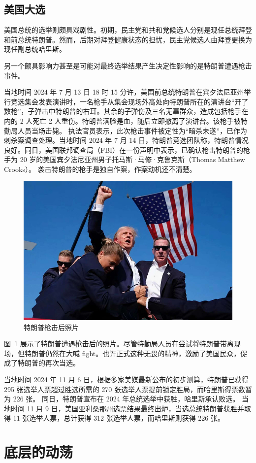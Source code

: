 \subsection{美国大选}

美国总统的选举则颇具戏剧性。初期，民主党和共和党候选人分别是现任总统拜登和前总统特朗普。然而，后期对拜登健康状态的担忧，民主党候选人由拜登更换为现任副总统哈里斯。

另一个颇具影响力甚至是可能对最终选举结果产生决定性影响的是特朗普遭遇枪击事件。

当地时间 2024 年 7 月 13 日 18 时 15 分许，美国前总统特朗普在宾夕法尼亚州举行竞选集会发表演讲时，一名枪手从集会现场外高处向特朗普所在的演讲台“开了数枪”，子弹击中特朗普的右耳。其余的子弹伤及三名无辜群众，造成包括枪手在内的 2 人死亡 2 人重伤。特朗普满脸是血，随后立即撤离了演讲台。该枪手被特勤局人员当场击毙。
执法官员表示，此次枪击事件被定性为“暗杀未遂”，已作为刺杀案调查处理。当地时间 2024 年 7 月 14 日，特朗普竞选团队称，特朗普情况良好。同日，美国联邦调查局（FBI）在一份声明中表示，已确认枪击特朗普的枪手为 20 岁的美国宾夕法尼亚州男子托马斯·马修·克鲁克斯（Thomas Matthew Crooks）。 袭击特朗普的枪手是独自作案，作案动机还不清楚。


\begin{figure}[htbp]
  \centering
  \includegraphics[width=0.5\linewidth]{./images/trump_shoot.jpg}
  \caption{特朗普枪击后照片}\label{fig:trump_shoot}
\end{figure}

图~\ref{fig:trump_shoot} 展示了特朗普遭遇枪击后的照片。尽管特勤局人员在尝试将特朗普带离现场，但特朗普仍然在大喊 fight。也许正式这种无畏的精神，激励了美国民众，促成了特朗普的再次当选。

当地时间 2024 年 11 月 6 日，根据多家美媒最新公布的初步测算，特朗普已获得 295 张选举人票超过胜选所需的 270 张选举人票提前锁定胜局，而哈里斯得票数暂为 226 张。 同日，特朗普宣布在 2024 年总统选举中获胜，哈里斯承认败选。 当地时间 11 月 9 日，美国亚利桑那州选票结果最终出炉，当选总统特朗普获胜并取得 11 张选举人票，总计获得 312 张选举人票，而哈里斯则获得 226 张。

\section{底层的动荡}

